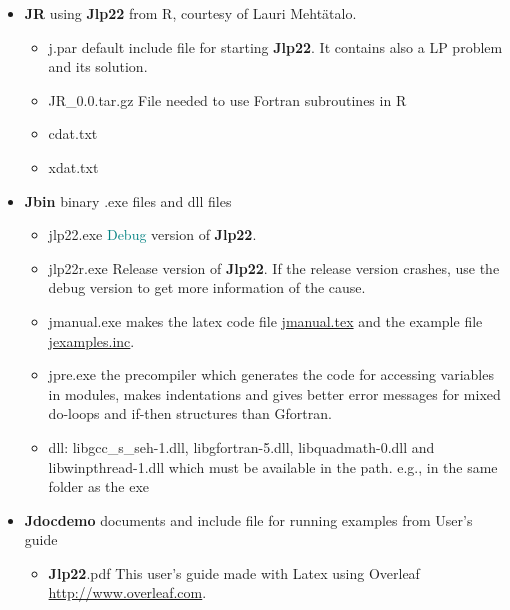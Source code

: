 \begin{itemize} 
 
 
\item \textbf{JR}  \hspace{0.2cm} using \textbf{Jlp22} from R, courtesy of Lauri Meht\"atalo. 
 
\begin{itemize} 
\item j.par \hspace{0.2cm}default include file for starting \textbf{Jlp22}. It contains also a LP 
problem and its solution. 
\item JR\_0.0.tar.gz \hspace{0.2cm} File needed to use Fortran subroutines in R 
\item cdat.txt 
\item xdat.txt 
\end{itemize} 
 
\item \textbf{Jbin}\hspace{0.2cm} binary .exe files and dll files 
\begin{itemize} 
\item jlp22.exe \hspace{0.2cm} \textcolor{teal}{Debug} version of \textbf{Jlp22}. 
\item jlp22r.exe \hspace{0.2cm} Release version of \textbf{Jlp22}. If the release version crashes, 
use the debug version to get more information of the cause. 
\item jmanual.exe \hspace{0.2cm} makes the latex code file  \href{run:./jmanual.tex}{jmanual.tex} and 
the example file \href{run:./jexamples.inc}{jexamples.inc}. 
\item jpre.exe \hspace{0.2cm} the precompiler which generates the code 
for accessing variables in modules, makes indentations and gives better error messages 
for mixed do-loops and if-then structures than Gfortran. 
\item dll:\hspace{0.2cm} libgcc\_s\_seh-1.dll, libgfortran-5.dll, libquadmath-0.dll and 
libwinpthread-1.dll which must be available in the path. e.g., in the same folder as the exe 
\end{itemize} 
 
\item \textbf{Jdocdemo} \hspace{0.2cm}documents and include file for running examples from User's guide 
\begin{itemize} 
\item \textbf{Jlp22}.pdf \hspace{0.2cm} This user's guide made with Latex using Overleaf \url{http://www.overleaf.com}. 
 

\end{itemize}
\end{itemize}
